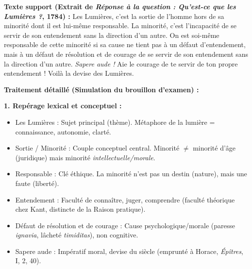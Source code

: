 \documentclass[11pt]{article}
\newcommand{\cle}[1]{{\popxbold\color{popdark}#1}}
\begin{document}
\begin{exoresolu}
\textbf{Texte support (Extrait de \emph{Réponse à la question : Qu'est-ce que les Lumières ?}, 1784) :}
\guillemotleft Les Lumières, c'est la sortie de l'homme hors de sa minorité dont il est lui-même responsable. La minorité, c'est l'incapacité de se servir de son entendement sans la direction d'un autre. On est soi-même responsable de cette minorité si sa cause ne tient pas à un défaut d'entendement, mais à un défaut de résolution et de courage de se servir de son entendement sans la direction d'un autre. \emph{Sapere aude !} Aie le courage de te servir de ton propre entendement ! Voilà la devise des Lumières. \guillemotright

\tcblower
\textbf{Traitement détaillé (Simulation du brouillon d'examen) :}

\textbf{1. Repérage lexical et conceptuel :}
\begin{itemize}
    \item \cle{Les Lumières} : Sujet principal (thème). Métaphore de la lumière = connaissance, autonomie, clarté.
    \item \cle{Sortie} / \cle{Minorité} : Couple conceptuel central. Minorité $\neq$ minorité d'âge (juridique) mais minorité \emph{intellectuelle/morale}.
    \item \cle{Responsable} : Clé éthique. La minorité n'est pas un destin (nature), mais une faute (liberté).
    \item \cle{Entendement} : Faculté de connaître, juger, comprendre (faculté théorique chez Kant, distincte de la Raison pratique).
    \item \cle{Défaut de résolution et de courage} : Cause psychologique/morale (paresse \emph{ignavia}, lâcheté \emph{timiditas}), non cognitive.
    \item \cle{Sapere aude} : Impératif moral, devise du siècle (emprunté à Horace, \emph{Épîtres}, I, 2, 40).
\end{itemize}


\end{exoresolu}
\end{document}
